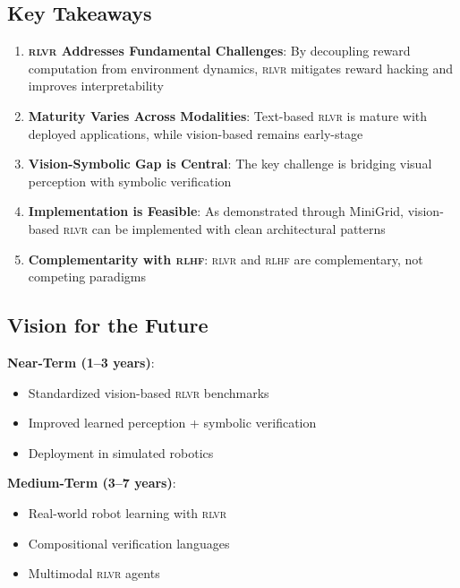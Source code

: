 \documentclass[11pt,a4paper]{article}
\newcommand{\rlvr}{\textsc{rlvr}}
\newcommand{\rlhf}{\textsc{rlhf}}
\begin{document}
\subsection{Key Takeaways}

\begin{enumerate}[leftmargin=*]
    \item \textbf{\rlvr{} Addresses Fundamental Challenges}: By decoupling reward computation from environment dynamics, \rlvr{} mitigates reward hacking and improves interpretability
    
    \item \textbf{Maturity Varies Across Modalities}: Text-based \rlvr{} is mature with deployed applications, while vision-based remains early-stage
    
    \item \textbf{Vision-Symbolic Gap is Central}: The key challenge is bridging visual perception with symbolic verification
    
    \item \textbf{Implementation is Feasible}: As demonstrated through MiniGrid, vision-based \rlvr{} can be implemented with clean architectural patterns
    
    \item \textbf{Complementarity with \rlhf{}}: \rlvr{} and \rlhf{} are complementary, not competing paradigms
\end{enumerate}

\subsection{Vision for the Future}

\textbf{Near-Term (1--3 years)}:
\begin{itemize}[leftmargin=*]
    \item Standardized vision-based \rlvr{} benchmarks
    \item Improved learned perception + symbolic verification
    \item Deployment in simulated robotics
\end{itemize}

\textbf{Medium-Term (3--7 years)}:
\begin{itemize}[leftmargin=*]
    \item Real-world robot learning with \rlvr{}
    \item Compositional verification languages
    \item Multimodal \rlvr{} agents
\end{itemize}
\end{document}
